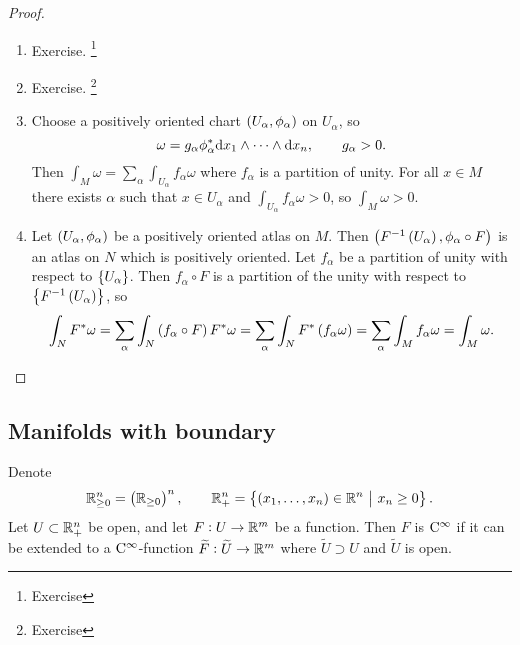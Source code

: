 \begin{proof}
\hfill
\begin{enumerate}
\item Exercise. \footnote{Exercise}
\item Exercise. \footnote{Exercise}
\item Choose a positively oriented chart $ \br{U_\alpha, \phi_\alpha} $ on $ U_\alpha $, so
$$ \omega = g_\alpha\phi_\alpha^*\mathrm{d} x_1 \wedge \dots \wedge \mathrm{d} x_n, \qquad g_\alpha > 0. $$
Then $ \int_M \omega = \sum_\alpha \int_{U_\alpha} f_\alpha\omega $ where $ f_\alpha $ is a partition of unity. For all $ x \in M $ there exists $ \alpha $ such that $ x \in U_\alpha $ and $ \int_{U_\alpha} f_\alpha\omega > 0 $, so $ \int_M \omega > 0 $.
\item Let $ \br{U_\alpha, \phi_\alpha} $ be a positively oriented atlas on $ M $. Then $ \br{F^{-1}\br{U_\alpha}, \phi_\alpha \circ F} $ is an atlas on $ N $ which is positively oriented. Let $ f_\alpha $ be a partition of unity with respect to $ \cbr{U_\alpha} $. Then $ f_\alpha \circ F $ is a partition of the unity with respect to $ \cbr{F^{-1}\br{U_\alpha}} $, so
$$ \int_N F^*\omega = \sum_\alpha \int_N \br{f_\alpha \circ F}F^*\omega = \sum_\alpha \int_N F^*\br{f_\alpha\omega} = \sum_\alpha \int_M f_\alpha\omega = \int_M \omega. $$
\end{enumerate}
\end{proof}

\pagebreak

\subsection{Manifolds with boundary}

Denote
$$ \RR_{\ge 0}^n = \br{\RR_{\ge 0}}^n, \qquad \RR_+^n = \cbr{\br{x_1, \dots, x_n} \in \RR^n \st x_n \ge 0}. $$
Let $ U \subset \mathbb{R}_+^n $ be open, and let $ F : U \to \mathbb{R}^m $ be a function. Then $ F $ is $ \mathrm{C}^\infty $ if it can be extended to a $ \mathrm{C}^\infty $-function $ \widetilde{F} : \widetilde{U} \to \mathbb{R}^m $ where $ \widetilde{U} \supset U $ and $ \widetilde{U} $ is open.


